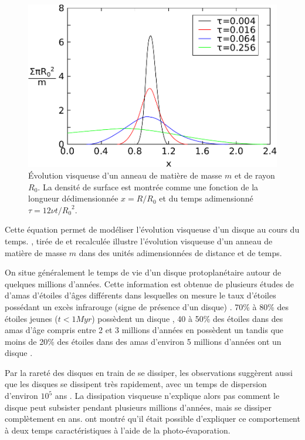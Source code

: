 \begin{figure}[htbp]
\centering
\includegraphics[width=0.65\linewidth]{figure/pringle_viscous_dissipation.pdf}
\caption[Évolution visqueuse d'un anneau de matière]{Évolution visqueuse d'un anneau de matière de masse $m$ et de rayon $R_0$.
La densité de surface est montrée comme une fonction de la longueur dédimensionnée $x=R/R_0$ et du temps adimensionné
$\tau=12\nu t / {R_0}^2$.}\label{fig:pringle_viscous_dissipation}
\end{figure}

Cette équation permet de modéliser l'évolution visqueuse d'un disque au cours du temps. , tirée de \cite{pringle1981accretion} et recalculée illustre l'évolution visqueuse d'un anneau de matière de masse $m$ dans des unités adimensionnées de distance et de temps.

\bigskip

On situe généralement le temps de vie d'un disque protoplanétaire autour de quelques millions d'années. Cette information est obtenue de plusieurs études de d'amas d'étoiles d'âges différents dans lesquelles on mesure le taux d'étoiles possédant un excès infrarouge (signe de présence d'un disque) \citep{williams2011protoplanetary}. 70\% à 80\% des étoiles jeunes ($t<1\unit{Myr}$) possèdent un disque \citep{winston2007combined, gutermuth2008spitzer}, 40 à 50\% des étoiles dans des amas d'âge compris entre 2 et 3 millions d'années en possèdent un \citep{lada2006spitzer, sung2009spitzer} tandis que moins de 20\% des étoiles dans des amas d'environ 5 millions d'années ont un disque \citep{currie2009last}. 

Par la rareté des disques en train de se dissiper, les observations suggèrent aussi que les disques se dissipent très rapidement, avec un temps de dispersion d'environ $10^5$ ans \citep{simon1995disk, wolk1996search}. La dissipation visqueuse n'explique alors pas comment le disque peut subsister pendant plusieurs millions d'années, mais se dissiper complètement en  ans. \cite{clarke2001dispersal} ont montré qu'il était possible d'expliquer ce comportement à deux temps caractéristiques à l'aide de la photo-évaporation. 

